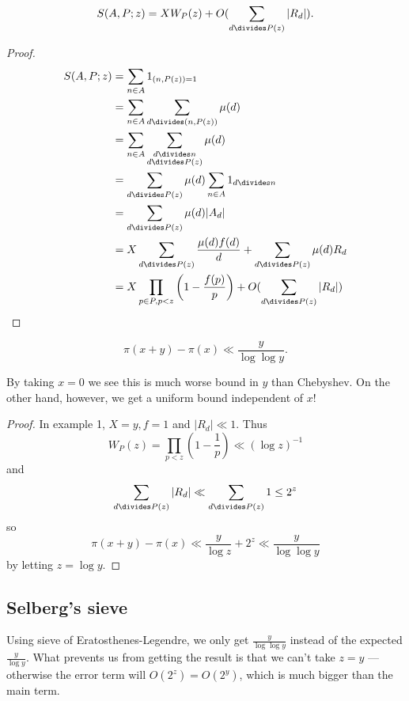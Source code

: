 \documentclass[a4paper]{article}
\begin{document}
\begin{theorem}
  \[
    S(A, P; z) = XW_P(z) + O(\sum_{d \divides P(z)} |R_d|).
  \]
\end{theorem}

\begin{proof}
  \begin{align*}
    S(A, P; z)
    &= \sum_{n \in A} 1_{(n, P(z)) = 1} \\
    &= \sum_{n \in A} \sum_{d \divides (n, P(z))} \mu(d) \\
    &= \sum_{n \in A} \sum_{\substack{d \divides n \\ d \divides P(z)}} \mu(d) \\
    &= \sum_{d \divides P(z)} \mu(d) \sum_{n \in A} 1_{d \divides n} \\
    &= \sum_{d \divides P(z)} \mu(d) |A_d| \\
    &= X \sum_{d \divides P(z)} \frac{\mu(d) f(d)}{d} + \sum_{d \divides P(z)} \mu(d) R_d \\
    &= X \prod_{p \in P, p < z} \left(1 - \frac{f(p)}{p} \right) + O(\sum_{d \divides P(z)} |R_d|)
  \end{align*}
\end{proof}

\begin{corollary}
  \[
    \pi(x + y) - \pi(x) \ll \frac{y}{\log \log y}.
  \]
\end{corollary}
By taking \(x = 0\) we see this is much worse bound in \(y\) than Chebyshev. On the other hand, however, we get a uniform bound independent of \(x\)!

\begin{proof}
  In example 1, \(X = y, f = 1\) and \(|R_d| \ll 1\). Thus
  \[
    W_P(z)
    = \prod_{p < z} \left( 1 - \frac{1}{p} \right)
    \ll (\log z)^{-1}
  \]
  and
  \[
    \sum_{d \divides P(z)} |R_d| \ll \sum_{d \divides P(z)} 1 \leq 2^z
  \]
  so
  \[
    \pi(x + y) - \pi(x) \ll \frac{y}{\log z} + 2^z \ll \frac{y}{\log \log y}
  \]
  by letting \(z = \log y\).
\end{proof}

\subsection{Selberg's sieve}

Using sieve of Eratosthenes-Legendre, we only get \(\frac{y}{\log\log y}\) instead of the expected \(\frac{y}{\log y}\). What prevents us from getting the result is that we can't take \(z = y\) --- otherwise the error term will \(O(2^z) = O(2^y)\), which is much bigger than the main term.
\end{document}
